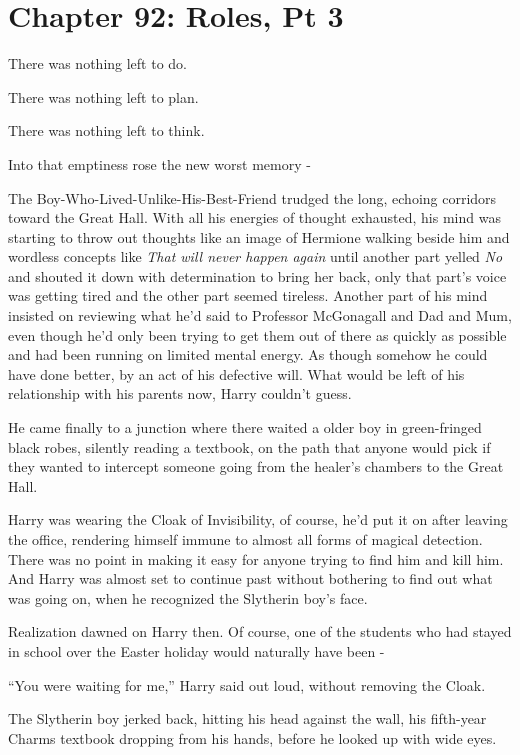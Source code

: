 \chapter{Chapter 92: Roles, Pt 3}
There was nothing left to do.

There was nothing left to plan.

There was nothing left to think.

Into that emptiness rose the new worst memory -

The Boy-Who-Lived-Unlike-His-Best-Friend trudged the long, echoing corridors toward the Great Hall. With all his energies of thought exhausted, his mind was starting to throw out thoughts like an image of Hermione walking beside him and wordless concepts like \emph{That will never happen again} until another part yelled \emph{No} and shouted it down with determination to bring her back, only that part's voice was getting tired and the other part seemed tireless. Another part of his mind insisted on reviewing what he'd said to Professor McGonagall and Dad and Mum, even though he'd only been trying to get them out of there as quickly as possible and had been running on limited mental energy. As though somehow he could have done better, by an act of his defective will. What would be left of his relationship with his parents now, Harry couldn't guess.

He came finally to a junction where there waited a older boy in green-fringed black robes, silently reading a textbook, on the path that anyone would pick if they wanted to intercept someone going from the healer's chambers to the Great Hall.

Harry was wearing the Cloak of Invisibility, of course, he'd put it on after leaving the office, rendering himself immune to almost all forms of magical detection. There was no point in making it easy for anyone trying to find him and kill him. And Harry was almost set to continue past without bothering to find out what was going on, when he recognized the Slytherin boy's face.

Realization dawned on Harry then. Of course, one of the students who had stayed in school over the Easter holiday would naturally have been -

``You were waiting for me,'' Harry said out loud, without removing the Cloak.

The Slytherin boy jerked back, hitting his head against the wall, his fifth-year Charms textbook dropping from his hands, before he looked up with wide eyes.

